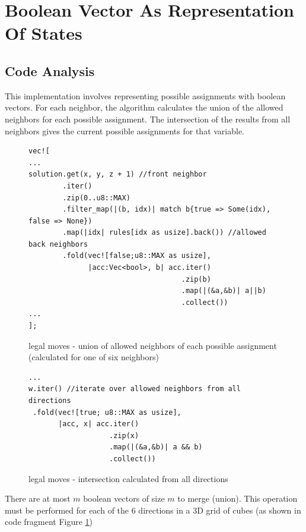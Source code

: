 \documentclass[shortabstract, english, inz]{iithesis}
\begin{document}
\section{Boolean Vector As Representation Of States}
\subsection{Code Analysis}
This implementation involves representing possible assignments with boolean vectors.  For each neighbor, the algorithm calculates the union of the allowed neighbors for each possible assignment.  The intersection of the results from all neighbors gives the current possible assignments for that variable.





\begin{figure}
\begin{verbatim}
vec![
...
solution.get(x, y, z + 1) //front neighbor
        .iter()
        .zip(0..u8::MAX)
        .filter_map(|(b, idx)| match b{true => Some(idx), false => None})
        .map(|idx| rules[idx as usize].back()) //allowed back neighbors
        .fold(vec![false;u8::MAX as usize],
              |acc:Vec<bool>, b| acc.iter()
                                    .zip(b)
                                    .map(|(&a,&b)| a||b)
                                    .collect())
...
];

\end{verbatim}
\caption{legal moves - union of allowed neighbors of each possible assignment (calculated for one of six neighbors)}
\label{fig:legal-union}
\end{figure}

\begin{figure}
\begin{verbatim}
...
w.iter() //iterate over allowed neighbors from all directions
 .fold(vec![true; u8::MAX as usize],
       |acc, x| acc.iter()
                   .zip(x)
                   .map(|(&a,&b)| a && b)
                   .collect())
\end{verbatim}
\caption{legal moves - intersection calculated from all directions}
\label{fig:legal-intersection}
\end{figure}

There are at most \( m \) boolean vectors of size \( m \) to merge (union). This operation must be performed for each of the 6 directions in a 3D grid of cubes (as shown in code fragment Figure \ref{fig:legal-union})
\end{document}
